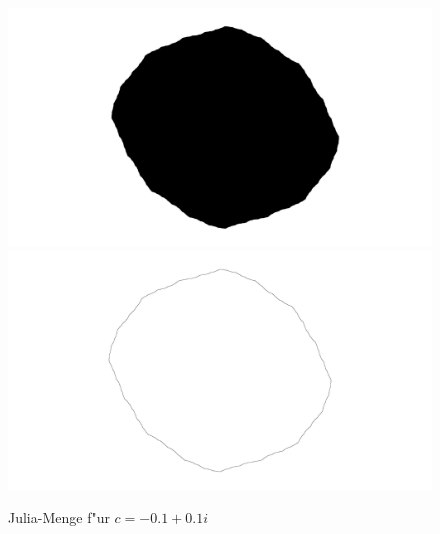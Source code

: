 \begin{refsection}
\begin{figure}
\begin{center}
\includegraphics[width=\hsize]{julia/a.png}
\\
\includegraphics[width=\hsize]{julia/j-a.png}
\end{center}
\caption{Julia-Menge f"ur $c= -0.1+0.1i$}
\end{figure}


\printbibliography[heading=subbibliography]
\end{refsection}
